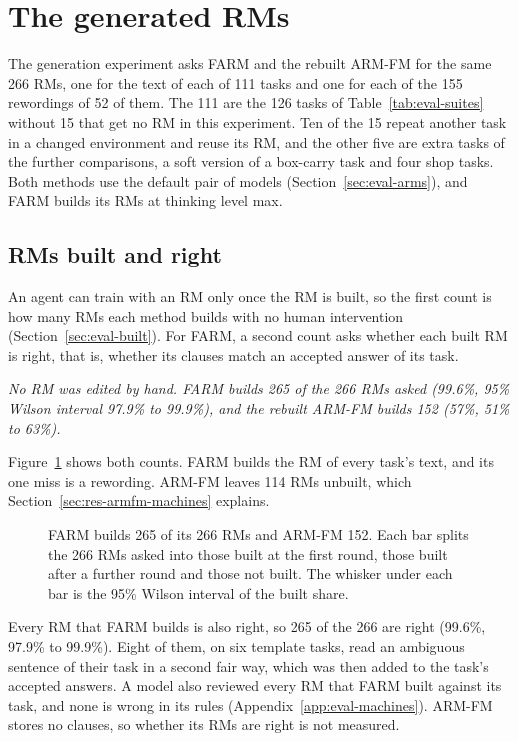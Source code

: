 \documentclass[11pt,english,listoffigures,listoftables]{tfgetsinf}
\newcommand{\keyidea}[1]{\par\smallskip\noindent\hspace*{0.6em}{\color{gray!55}\vrule width 1.5pt}\hspace{8pt}\parbox[t]{\dimexpr\linewidth-0.6em-9.5pt\relax}{\itshape #1}\par\smallskip}  %
\begin{document}
\section{The generated RMs}
\label{sec:res-comparison}

The generation experiment asks FARM and the rebuilt ARM-FM for the same 266 RMs, one for the text of each of 111 tasks and one for each of the 155 rewordings of 52 of them. The 111 are the 126 tasks of Table~\ref{tab:eval-suites} without 15 that get no RM in this experiment. Ten of the 15 repeat another task in a changed environment and reuse its RM, and the other five are extra tasks of the further comparisons, a soft version of a box-carry task and four shop tasks. Both methods use the default pair of models (Section~\ref{sec:eval-arms}), and FARM builds its RMs at thinking level max.

\subsection{RMs built and right}
\label{sec:res-built}
\label{sec:res-farm-machines}

An agent can train with an RM only once the RM is built, so the first count is how many RMs each method builds with no human intervention (Section~\ref{sec:eval-built}). For FARM, a second count asks whether each built RM is right, that is, whether its clauses match an accepted answer of its task.

\keyidea{No RM was edited by hand. FARM builds 265 of the 266 RMs asked (99.6\%, 95\% Wilson interval 97.9\% to 99.9\%), and the rebuilt ARM-FM builds 152 (57\%, 51\% to 63\%).}

\noindent Figure~\ref{fig:res-built} shows both counts. FARM builds the RM of every task's text, and its one miss is a rewording. ARM-FM leaves 114 RMs unbuilt, which Section~\ref{sec:res-armfm-machines} explains.

\begin{figure}[!htb]
\centering

\caption[RMs built per method]{FARM builds 265 of its 266 RMs and ARM-FM 152. Each bar splits the 266 RMs asked into those built at the first round, those built after a further round and those not built. The whisker under each bar is the 95\% Wilson interval of the built share.}
\label{fig:res-built}
\end{figure}

Every RM that FARM builds is also right, so 265 of the 266 are right (99.6\%, 97.9\% to 99.9\%). Eight of them, on six template tasks, read an ambiguous sentence of their task in a second fair way, which was then added to the task's accepted answers. A model also reviewed every RM that FARM built against its task, and none is wrong in its rules (Appendix~\ref{app:eval-machines}). ARM-FM stores no clauses, so whether its RMs are right is not measured.
\end{document}
